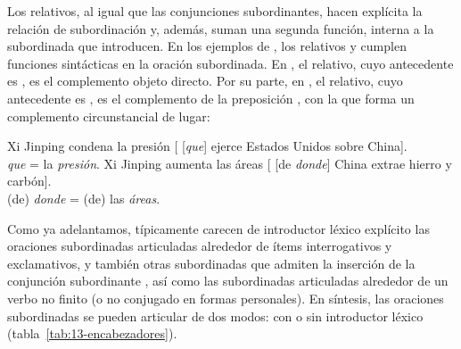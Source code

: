 Los relativos, al igual que las conjunciones subordinantes, hacen explícita la
relación de subordinación y, además, suman una segunda función, interna a la
subordinada que introducen. En los ejemplos de , los
relativos   y 
 cumplen funciones sintácticas en la oración
subordinada. En , el relativo, cuyo antecedente es
, es el complemento objeto directo. Por su parte, en
, el relativo, cuyo antecedente es , es
el complemento de la preposición , con la que forma un complemento
circunstancial de lugar:

\begin{exe}
  \ex\label{ex:13-relativos}
    \begin{xlist}
      \ex\label{ex:13-relativos-a} Xi Jinping condena la presión [
          [\textit{que}] ejerce Estados Unidos sobre China].\\
          \textit{que} = la \textit{presión}.
      \ex\label{ex:13-relativos-b} Xi Jinping aumenta las áreas [ [de
          \textit{donde}] China extrae hierro y carbón].\\
          (de) \textit{donde} = (de) las \textit{áreas}.
    \end{xlist}
\end{exe}

Como ya adelantamos, típicamente carecen de introductor léxico explícito las
oraciones subordinadas articuladas alrededor de ítems interrogativos y
exclamativos, y también otras subordinadas que admiten la inserción de la
conjunción subordinante , así como las subordinadas articuladas
alrededor de un verbo no finito (o no conjugado en formas personales). En
síntesis, las oraciones subordinadas se pueden articular de dos modos: con o sin
introductor léxico (tabla~\ref{tab:13-encabezadores}).

